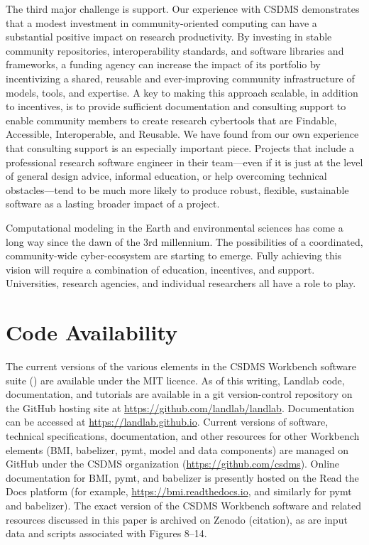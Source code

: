 \documentclass{article} %
\begin{document}
The third major challenge is support. Our experience with CSDMS demonstrates that a modest investment in community-oriented computing can have a substantial positive impact on research productivity. By investing in stable community repositories, interoperability standards, and software libraries and frameworks, a funding agency can increase the impact of its portfolio by incentivizing a shared, reusable and ever-improving community infrastructure of models, tools, and expertise. A key to making this approach scalable, in addition to incentives, is to provide sufficient documentation and consulting support to enable community members to create research cybertools that are Findable, Accessible, Interoperable, and Reusable. We have found from our own experience that consulting support is an especially important piece. Projects that include a professional research software engineer in their team---even if it is just at the level of general design advice, informal education, or help overcoming technical obstacles---tend to be much more likely to produce robust, flexible, sustainable software as a lasting broader impact of a project.

Computational modeling in the Earth and environmental sciences has come a long way since the dawn of the 3rd millennium. The possibilities of a coordinated, community-wide cyber-ecosystem are starting to emerge. Fully achieving this vision will require a combination of education, incentives, and support. Universities, research agencies, and individual researchers all have a role to play.


\section{Code Availability}

The current versions of the various elements in the CSDMS Workbench software suite () are available under the MIT licence. As of this writing, Landlab code, documentation, and tutorials are available in a git version-control repository on the GitHub hosting site at \url{https://github.com/landlab/landlab}. Documentation can be accessed at \url{https://landlab.github.io}. Current versions of software, technical specifications, documentation, and other resources for other Workbench elements (BMI, babelizer, pymt, model and data components) are managed on GitHub under the CSDMS organization (\url{https://github.com/csdms}). Online documentation for BMI, pymt, and babelizer is presently hosted on the Read the Docs platform (for example, \url{https://bmi.readthedocs.io}, and similarly for pymt and babelizer). The exact version of the CSDMS Workbench software and related resources discussed in this paper is archived on Zenodo (citation), as are input data and scripts associated with Figures 8--14.
\end{document}
